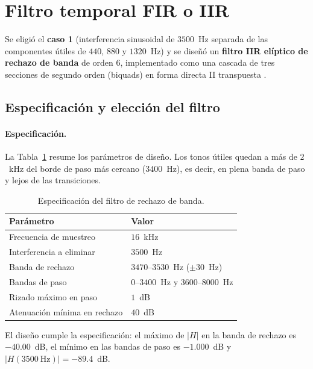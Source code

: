 
\section{Filtro temporal FIR o IIR}
\label{sec:temporal}

Se eligió el \textbf{caso 1} (interferencia sinusoidal de $3500$~Hz separada de las componentes útiles de $440$, $880$ y $1320$~Hz) y se diseñó un \textbf{filtro IIR elíptico de rechazo de banda} de orden 6, implementado como una cascada de tres secciones de segundo orden (biquads) en forma directa II transpuesta \cite{proakis2007}.

\subsection{Especificación y elección del filtro}

\paragraph{Especificación.} La Tabla~\ref{tab:espec} resume los parámetros de diseño. Los tonos útiles quedan a más de $2$~kHz del borde de paso más cercano ($3400$~Hz), es decir, en plena banda de paso y lejos de las transiciones.

\begin{table}[h]
\centering
\begin{tabular}{|l|l|}
\hline
\textbf{Parámetro} & \textbf{Valor} \\ \hline
Frecuencia de muestreo & $16$~kHz \\ \hline
Interferencia a eliminar & $3500$~Hz \\ \hline
Banda de rechazo & $3470$--$3530$~Hz ($\pm 30$~Hz) \\ \hline
Bandas de paso & $0$--$3400$~Hz y $3600$--$8000$~Hz \\ \hline
Rizado máximo en paso & $1$~dB \\ \hline
Atenuación mínima en rechazo & $40$~dB \\ \hline
\end{tabular}
\caption{Especificación del filtro de rechazo de banda.}
\label{tab:espec}
\end{table}

El diseño cumple la especificación: el máximo de $|H|$ en la banda de rechazo es $-40.00$~dB, el mínimo en las bandas de paso es $-1.000$~dB y $|H(3500~\mathrm{Hz})| = -89.4$~dB.

